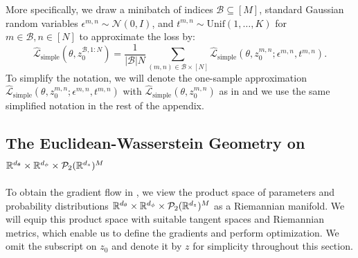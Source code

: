 More specifically, we draw a minibatch of indices $\mathcal{B} \subseteq [M]$, standard Gaussian random variables $\epsilon^{m,n} \sim \mathcal{N}(0,I)$, and $t^{m,n} \sim \text{Unif}(1, \ldots, K)$ for $m\in \mathcal{B}, n\in [N]$ to approximate the loss by:
\begin{equation}\label{eq_app:simplified_diffusion}
    \hat{\mathcal{L}}_{\text{simple}}(\theta, z_0^{\mathcal{B},1:N}) = \frac{1}{|\mathcal{B}|N} \sum_{(m,n)\in \mathcal{B}\times [N]} \hat{\mathcal{L}}_{\text{simple}}(\theta, z_0^{m,n}; \epsilon^{m,n}, t^{m,n}).
\end{equation}
To simplify the notation, we will denote the one-sample approximation  $\hat{\mathcal{L}}_{\text{simple}}(\theta, z_0^{m,n}; \epsilon^{m,n}, t^{m,n})$ with $\hat{\mathcal{L}}_{\text{simple}}(\theta, z_0^{m,n})$ as in  and we use the same simplified notation in the rest of the appendix.


\subsection{The Euclidean-Wasserstein Geometry on \texorpdfstring{$\mathbb{R}^{d_{\theta}} \times \mathbb{R}^{d_\phi}\times \mathcal{P}_2(\mathbb{R}^{d_z})^{M}$}{Theta x Phi x P2(Rdz)^M}}
\label{app:otto_calc}
To obtain the gradient flow in , we view the product space of parameters and probability distributions $\mathbb{R}^{d_{\theta}} \times \mathbb{R}^{d_\phi}\times \mathcal{P}_2(\mathbb{R}^{d_z})^M$ as a Riemannian manifold. We will equip this product space with suitable tangent spaces and Riemannian metrics, which enable us to define the gradients and perform optimization. We omit the subscript on $z_0$ and denote it by $z$ for simplicity throughout this section.

